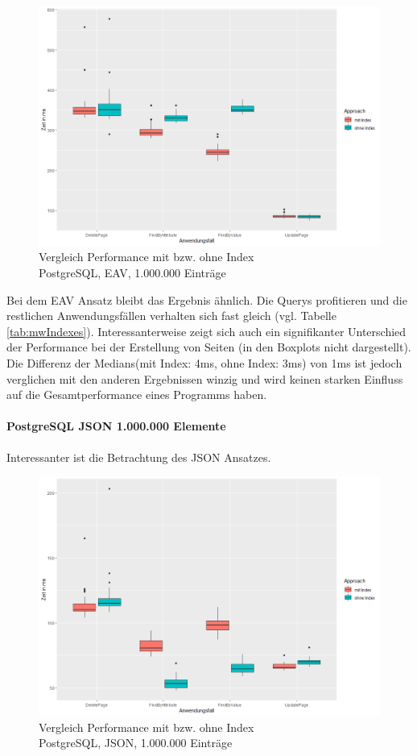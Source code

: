 \begin{figure}[H]
\centering
\includegraphics[scale=0.5]{rStudioPictures/eav1mIndexesAll1000700.png}
\caption{Vergleich Performance mit bzw. ohne Index \\ PostgreSQL, EAV, 1.000.000 Einträge}
\label{fig:eav1mIndex}
\end{figure}

Bei dem EAV Ansatz bleibt das Ergebnis ähnlich. Die Querys profitieren und die restlichen Anwendungsfällen verhalten sich fast gleich (vgl. Tabelle \ref{tab:mwIndexes}). Interessanterweise zeigt sich auch ein signifikanter Unterschied der Performance bei der Erstellung von Seiten (in den Boxplots nicht dargestellt). Die Differenz der Medians(mit Index: 4ms, ohne Index: 3ms) von 1ms ist jedoch verglichen mit den anderen Ergebnissen winzig und wird keinen starken Einfluss auf die Gesamtperformance eines Programms haben.


\paragraph*{PostgreSQL JSON 1.000.000 Elemente}
Interessanter ist die Betrachtung des JSON Ansatzes. 

\begin{figure}[H]
\centering
\includegraphics[scale=0.5]{rStudioPictures/json1mIndexes1000700.png}
\caption{Vergleich Performance mit bzw. ohne Index \\ PostgreSQL, JSON, 1.000.000 Einträge}
\label{fig:json1mIndex}
\end{figure}

